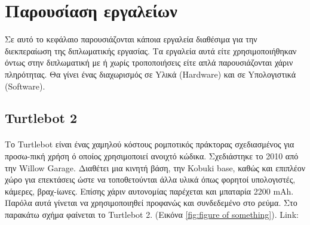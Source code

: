 \section{Παρουσίαση εργαλείων}

Σε αυτό το κεφάλαιο παρουσιάζονται κάποια εργαλεία διαθέσιμα για την διεκπεραίωση της διπλωματικής εργασίας. Τα εργαλεία αυτά είτε χρησιμοποιήθηκαν όντως στην διπλωματική με ή χωρίς τροποποιήσεις είτε απλά παρουσιάζονται χάριν πληρότητας. Θα γίνει ένας διαχωρισμός σε Yλικά (Hardware) και σε Yπολογιστικά (Software). 




\subsection{Turtlebot 2}

\paragraph{} Το Turtlebot είναι ένας χαμηλού κόστους ρομποτικός πράκτορας σχεδιασμένος για προσω-πική χρήση ό οποίος χρησιμοποιεί ανοιχτό κώδικα. Σχεδιάστηκε το 2010 από την Willow Garage. Διαθέτει μια κινητή βάση, την Kobuki base, καθώς και επιπλέον χώρο για επεκτάσεις ώστε να τοποθετούνται άλλα υλικά όπως φορητοί υπολογιστές, κάμερες, βραχ-ίωνες. Επίσης χάριν αυτονομίας παρέχεται και μπαταρία 2200 mAh. Παρόλα αυτά γίνεται να χρησιμοποιηθεί προφανώς και συνδεδεμένο στο ρεύμα. Στο παρακάτω σχήμα φαίνεται το Turtlebot 2. (Εικόνα \ref{fig:figure of something}). Link: \href{https://www.turtlebot.com/}{\color{blue}{Turtlebot 2}}

